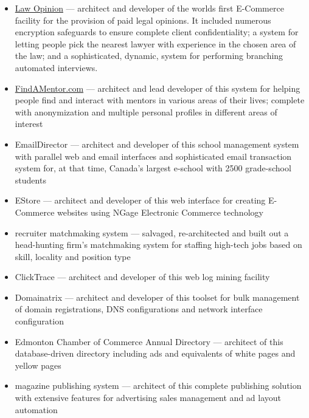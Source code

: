 \documentclass[line,margin,hidelinks]{res}
\begin{document}
\begin{resume}
\begin{position}
\begin{itemize}
\item \href{https://web.archive.org/web/19991205174419/http://www.lawopinion.com/}{Law Opinion}
   --- architect and developer of the worlds first E-Commerce facility for
       the provision of paid legal opinions.
       It included numerous encryption safeguards
       to ensure complete client confidentiality; a
       system for letting people pick the nearest
       lawyer with experience in the chosen area of
       the law;  and a sophisticated, dynamic,
       system for performing branching automated interviews.
\item \href{http://findamentor.com/}{FindAMentor.com}
   --- architect and lead developer of this system
       for helping people find and interact with mentors in
       various areas of their lives; complete with anonymization and
       multiple personal profiles in different areas of interest
\item EmailDirector
   --- architect and developer of this school management
       system with parallel web and email interfaces
       and sophisticated email transaction system for,
       at that time, Canada's largest e-school
       with 2500 grade-school students
\item EStore
   --- architect and developer of this web interface for creating E-Commerce
       websites using NGage Electronic Commerce technology
\item recruiter matchmaking system
   --- salvaged, re-architected and built out a head-hunting firm's
       matchmaking system for staffing high-tech jobs based on skill, locality
       and position type
\item ClickTrace --- architect and developer of this web log mining facility
\item Domainatrix --- architect and developer of this
                      toolset for bulk management of domain registrations,
                      DNS configurations and network interface
                      configuration
\item Edmonton Chamber of Commerce Annual Directory ---
         architect of this database-driven directory
         including ads and equivalents of white pages and yellow pages
\item magazine publishing system ---
  architect of this complete publishing solution
  with extensive features for advertising sales management and ad layout
  automation

\end{itemize}


\end{position}
\end{resume}
\end{document}
